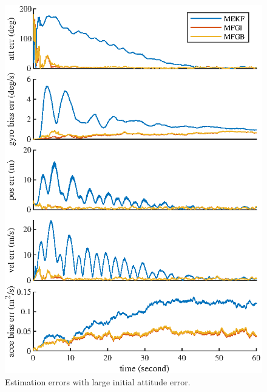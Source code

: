 \begin{figure}
	\centering
	\includegraphics[scale=1.2]{figures/posEst-error}
	\caption{Estimation errors with large initial attitude error.}
	\label{fig:posEst-error}
\end{figure}

